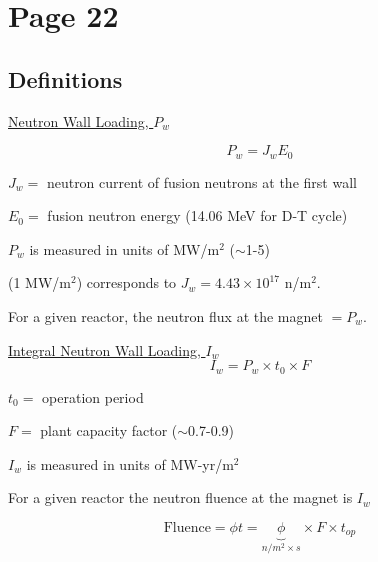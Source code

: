 \documentclass[11pt]{report} %
\begin{document}
\section{Page 22}
\subsection{Definitions}
\underline{Neutron Wall Loading, $P_w$}

\begin{equation}
  P_w = J_w E_0
\end{equation}

$J_w = $ neutron current of fusion neutrons at the first wall

$E_0 = $ fusion neutron energy (14.06 MeV for D-T cycle)

$P_w$ is measured in units of MW/m$^2$ ($\sim$1-5)

(1 MW/m$^2$) corresponds to $J_w = 4.43\times 10^{17}$ n/m$^2$.

For a given reactor, the neutron flux at the magnet $= P_w$.

\underline{Integral Neutron Wall Loading, $I_w$}
\begin{equation}
  I_w = P_w \times t_0 \times F
\end{equation}

$t_0 =$ operation period

$F =$ plant capacity factor ($\sim$0.7-0.9)

$I_w$ is measured in units of MW-yr/m$^2$

For a given reactor the neutron fluence at the magnet is $I_w$

\begin{equation}
  \text{Fluence} = \phi t = \underbrace{\phi}_{n/m^2\times s} \times F \times t_{op}
\end{equation}
\end{document}
